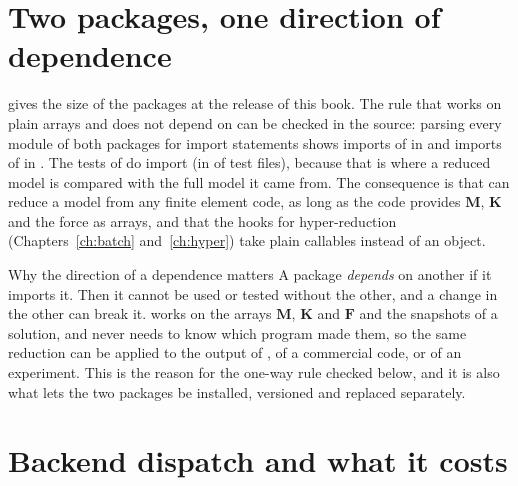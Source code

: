 \begin{table}[ht]
\centering\small

\caption{Interface conformance of the registered elements, by family.}\label{tab:ar-registry}
\end{table}

\section{Two packages, one direction of dependence}\label{sec:ar-packages}

 gives the size of the packages at the release of this book. The rule that \rom{} works on plain arrays and does not depend on \fea{} can be checked in the source: parsing every module of both packages for import statements shows \cdeFeaImportsRom{} imports of \rom{} in \fea{} and \cdeRomImportsFea{} imports of \fea{} in \rom{}. The tests of \rom{} do import \fea{} (in \cdeRomTestsImportFea{} of \cdeRomTestFiles{} test files), because that is where a reduced model is compared with the full model it came from. The consequence is that \rom{} can reduce a model from any finite element code, as long as the code provides $\bm M$, $\bm K$ and the force as arrays, and that the hooks for hyper-reduction (Chapters~\ref{ch:batch} and~\ref{ch:hyper}) take plain callables instead of an \fea{} object.

\begin{sidenote}{Why the direction of a dependence matters}
A package \emph{depends} on another if it imports it. Then it cannot be used or tested without the other, and a change in the other can break it. \rom{} works on the arrays $\bm M$, $\bm K$ and $\bm F$ and the snapshots of a solution, and never needs to know which program made them, so the same reduction can be applied to the output of \fea{}, of a commercial code, or of an experiment. This is the reason for the one-way rule checked below, and it is also what lets the two packages be installed, versioned and replaced separately.
\end{sidenote}

\begin{table}[ht]
\centering\small

\caption{Size of the packages: Python modules and lines (including comments and docstrings) in the source tree and in the tests.}\label{tab:ar-packages}
\end{table}

\section{Backend dispatch and what it costs}\label{sec:ar-backend}

